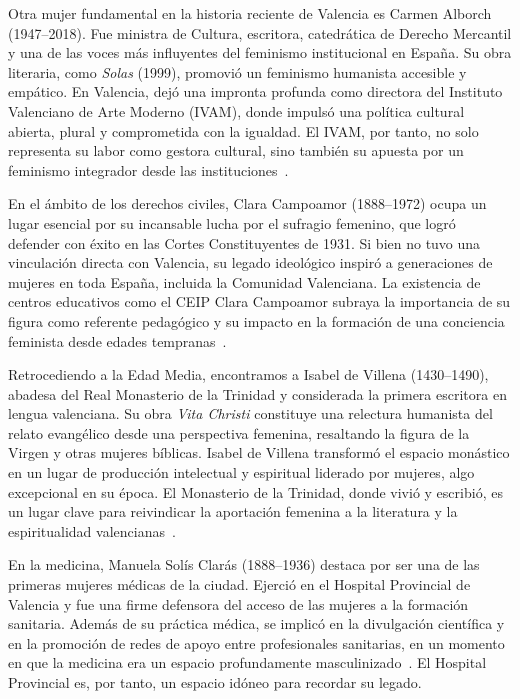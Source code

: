 Otra mujer fundamental en la historia reciente de Valencia es Carmen Alborch (1947–2018). Fue ministra de Cultura, escritora, catedrática de Derecho Mercantil y una de las voces más influyentes del feminismo institucional en España. Su obra literaria, como \textit{Solas} (1999), promovió un feminismo humanista accesible y empático. En Valencia, dejó una impronta profunda como directora del Instituto Valenciano de Arte Moderno (IVAM), donde impulsó una política cultural abierta, plural y comprometida con la igualdad. El IVAM, por tanto, no solo representa su labor como gestora cultural, sino también su apuesta por un feminismo integrador desde las instituciones~\cite{alborch1999}.

En el ámbito de los derechos civiles, Clara Campoamor (1888–1972) ocupa un lugar esencial por su incansable lucha por el sufragio femenino, que logró defender con éxito en las Cortes Constituyentes de 1931. Si bien no tuvo una vinculación directa con Valencia, su legado ideológico inspiró a generaciones de mujeres en toda España, incluida la Comunidad Valenciana. La existencia de centros educativos como el CEIP Clara Campoamor subraya la importancia de su figura como referente pedagógico y su impacto en la formación de una conciencia feminista desde edades tempranas~\cite{gonzalez2006}.

Retrocediendo a la Edad Media, encontramos a Isabel de Villena (1430–1490), abadesa del Real Monasterio de la Trinidad y considerada la primera escritora en lengua valenciana. Su obra \textit{Vita Christi} constituye una relectura humanista del relato evangélico desde una perspectiva femenina, resaltando la figura de la Virgen y otras mujeres bíblicas. Isabel de Villena transformó el espacio monástico en un lugar de producción intelectual y espiritual liderado por mujeres, algo excepcional en su época. El Monasterio de la Trinidad, donde vivió y escribió, es un lugar clave para reivindicar la aportación femenina a la literatura y la espiritualidad valencianas~\cite{rueda2013}.

En la medicina, Manuela Solís Clarás (1888–1936) destaca por ser una de las primeras mujeres médicas de la ciudad. Ejerció en el Hospital Provincial de Valencia y fue una firme defensora del acceso de las mujeres a la formación sanitaria. Además de su práctica médica, se implicó en la divulgación científica y en la promoción de redes de apoyo entre profesionales sanitarias, en un momento en que la medicina era un espacio profundamente masculinizado~\cite{martinez2019}. El Hospital Provincial es, por tanto, un espacio idóneo para recordar su legado.

